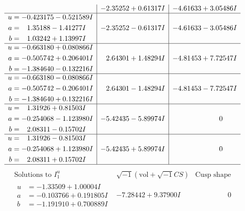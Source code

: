 \documentclass[1p]{elsarticle_modified}
\theoremstyle{definition}
\newcommand{\I}{\sqrt{-1}}
\begin{document}
$$\begin{array}{c|c|c}
 & -2.35252 + 0.61317 I & -4.61633 + 3.05486 I \\ \hline\begin{aligned}
u &= -0.423175 - 0.521589 I \\
a &= \phantom{-}1.35188 - 1.41277 I \\
b &= \phantom{-}1.03242 + 1.13997 I\end{aligned}
 & -2.35252 - 0.61317 I & -4.61633 - 3.05486 I \\ \hline\begin{aligned}
u &= -0.663180 + 0.080866 I \\
a &= -0.505742 + 0.206401 I \\
b &= -1.384640 - 0.132216 I\end{aligned}
 & \phantom{-}2.64301 + 1.48294 I & -4.81453 + 7.72547 I \\ \hline\begin{aligned}
u &= -0.663180 - 0.080866 I \\
a &= -0.505742 - 0.206401 I \\
b &= -1.384640 + 0.132216 I\end{aligned}
 & \phantom{-}2.64301 - 1.48294 I & -4.81453 - 7.72547 I \\ \hline\begin{aligned}
u &= \phantom{-}1.31926 + 0.81503 I \\
a &= -0.254068 - 1.123980 I \\
b &= \phantom{-}2.08311 - 0.15702 I\end{aligned}
 & -5.42435 - 5.89974 I & \phantom{-0.000000 } 0 \\ \hline\begin{aligned}
u &= \phantom{-}1.31926 - 0.81503 I \\
a &= -0.254068 + 1.123980 I \\
b &= \phantom{-}2.08311 + 0.15702 I\end{aligned}
 & -5.42435 + 5.89974 I & \phantom{-0.000000 } 0\\
 \hline 
 \end{array}$$\newpage$$\begin{array}{c|c|c}  
\text{Solutions to }I^u_{1}& \I (\text{vol} + \sqrt{-1}CS) & \text{Cusp shape}\\
 \hline 
\begin{aligned}
u &= -1.33509 + 1.00004 I \\
a &= -0.103766 + 0.191805 I \\
b &= -1.191910 + 0.700889 I\end{aligned}
 & -7.28442 + 9.37900 I & \phantom{-0.000000 } 0 \\ \hline\begin{aligned}

\end{aligned}
\end{array}$$
\end{document}
